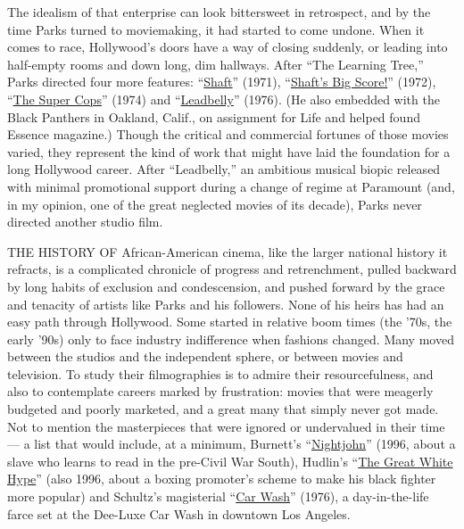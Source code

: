 The idealism of that enterprise can look bittersweet in retrospect, and
by the time Parks turned to moviemaking, it had started to come undone.
When it comes to race, Hollywood's doors have a way of closing suddenly,
or leading into half-empty rooms and down long, dim hallways. After
``The Learning Tree,'' Parks directed four more features:
``\href{https://www.nytimes.com/watching/titles/movies/1000012133}{Shaft}''
(1971),
``\href{https://www.nytimes.com/watching/titles/movies/1000146702}{Shaft's
Big Score!}'' (1972),
``\href{https://www.nytimes.com/watching/titles/movies/1000115487}{The
Super Cops}'' (1974) and
``\href{https://www.nytimes.com/watching/titles/movies/1000086190}{Leadbelly}''
(1976). (He also embedded with the Black Panthers in Oakland, Calif., on
assignment for Life and helped found Essence magazine.) Though the
critical and commercial fortunes of those movies varied, they represent
the kind of work that might have laid the foundation for a long
Hollywood career. After ``Leadbelly,'' an ambitious musical biopic
released with minimal promotional support during a change of regime at
Paramount (and, in my opinion, one of the great neglected movies of its
decade), Parks never directed another studio film.

THE HISTORY OF African-American cinema, like the larger national history
it refracts, is a complicated chronicle of progress and retrenchment,
pulled backward by long habits of exclusion and condescension, and
pushed forward by the grace and tenacity of artists like Parks and his
followers. None of his heirs has had an easy path through Hollywood.
Some started in relative boom times (the '70s, the early '90s) only to
face industry indifference when fashions changed. Many moved between the
studios and the independent sphere, or between movies and television. To
study their filmographies is to admire their resourcefulness, and also
to contemplate careers marked by frustration: movies that were meagerly
budgeted and poorly marketed, and a great many that simply never got
made. Not to mention the masterpieces that were ignored or undervalued
in their time --- a list that would include, at a minimum, Burnett's
``\href{https://www.nytimes.com/watching/titles/movies/1000115143}{Nightjohn}''
(1996, about a slave who learns to read in the pre-Civil War South),
Hudlin's
``\href{https://www.nytimes.com/watching/titles/movies/1000114177}{The
Great White Hype}'' (also 1996, about a boxing promoter's scheme to make
his black fighter more popular) and Schultz's magisterial
``\href{https://www.nytimes.com/watching/titles/movies/1000082349}{Car
Wash}'' (1976), a day-in-the-life farce set at the Dee-Luxe Car Wash in
downtown Los Angeles.

